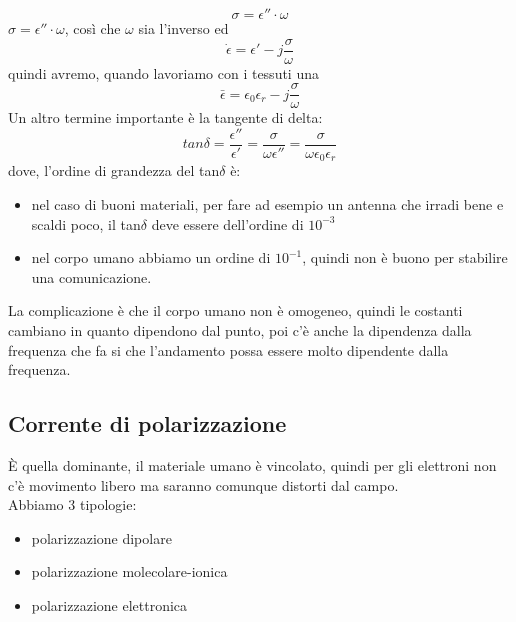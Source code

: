\documentclass[oneside, 12pt]{extbook}
\begin{document}
\begin{equation}
	\sigma = \epsilon'' \cdot \omega
\end{equation}
 $\sigma = \epsilon'' \cdot \omega$, così che $\omega$ sia l'inverso ed 
\begin{equation}
 	\dot{\epsilon} = \epsilon' - j\frac{\sigma}{\omega}
\end{equation}
quindi avremo, quando lavoriamo con i tessuti una 
\begin{equation}
	\bar{\epsilon} = \epsilon_0 \epsilon_r -j \frac{\sigma}{\omega}
\end{equation}
Un altro termine importante è la tangente di delta:
\begin{equation}
	tan \delta = \frac{\epsilon''}{\epsilon'} = \frac{\sigma}{\omega \epsilon''} = \frac{\sigma}{\omega \epsilon_0 \epsilon_r}
\end{equation}
dove, l'ordine di grandezza del tan$\delta$ è:
\begin{itemize}
	\item nel caso di buoni materiali, per fare ad esempio un antenna che irradi bene e scaldi poco, il tan$\delta$ deve essere dell'ordine di $10^{-3}$
	\item nel corpo umano abbiamo un ordine di $10^{-1}$, quindi non è buono per stabilire una comunicazione.
\end{itemize}
La complicazione è che il corpo umano non è omogeneo, quindi le costanti cambiano in quanto dipendono dal punto, poi c'è anche la dipendenza dalla frequenza che fa si che l'andamento possa essere molto dipendente dalla frequenza.
\subsection{Corrente di polarizzazione}
È quella dominante, il materiale umano è vincolato, quindi per gli elettroni non c'è movimento libero ma saranno comunque distorti dal campo.\\Abbiamo 3 tipologie:
\begin{itemize}
	\item polarizzazione dipolare
	\item polarizzazione molecolare-ionica
	\item polarizzazione elettronica
\end{itemize}
\end{document}
